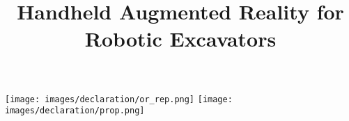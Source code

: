 \documentclass[10pt,twoside,a4paper]{report}
\begin{document}
\title{Handheld Augmented Reality for Robotic Excavators}




\projectYear{\the\year} %

\maketitle
\pagestyle{plain}

\pagestyle{empty}

% 
% 
\begin{center}
    \texttt{[image: images/declaration/or\_rep.png]}
    \texttt{[image: images/declaration/prop.png]}
\end{center}

\setcounter{tocdepth}{2}

\cleardoublepage
\tableofcontents


\clearpage

\clearpage
% 

\pagestyle{fancy}



\clearpage
% 
% 
% 
% 
\end{document}
